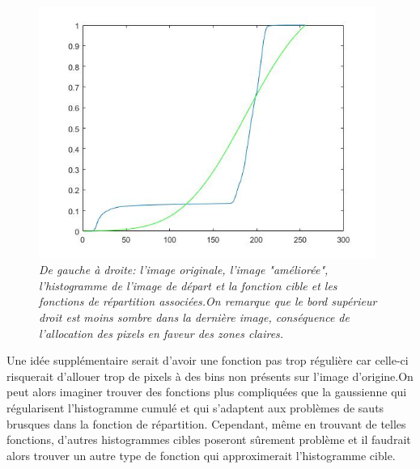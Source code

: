 \documentclass{article}
\begin{document}
\begin{figure}[!hbt]
\begin{minipage}{0.25\textwidth}
\end{minipage}%
\begin{minipage}{0.25\textwidth}
\centering
\includegraphics[width=0.98\textwidth]{images/p3_birds_cumsum.jpg}
\end{minipage}
\caption{\textit{De gauche à droite: l'image originale, l'image "améliorée", l'histogramme de l'image de départ et la fonction cible et les fonctions de répartition associées.On remarque que le bord supérieur droit est moins sombre dans la dernière image, conséquence de l'allocation des pixels en faveur des zones claires.}}
\label{fig:birds}
\end{figure}
\FloatBarrier
Une idée supplémentaire serait d'avoir une fonction pas trop régulière car celle-ci risquerait d'allouer trop de pixels à des bins non présents sur l'image d'origine.On peut alors imaginer trouver des fonctions plus compliquées que la gaussienne qui régularisent l'histogramme cumulé et qui s'adaptent aux problèmes de sauts brusques dans la fonction de répartition. Cependant, même en trouvant de telles fonctions, d'autres histogrammes cibles poseront sûrement problème et il faudrait alors trouver un autre type de fonction qui approximerait l'histogramme cible.
\end{document}
